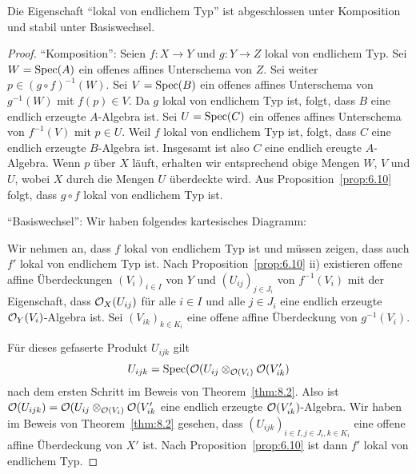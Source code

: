 \begin{prop}
\label{prop:8.11}
	Die Eigenschaft \enquote{lokal von endlichem Typ} ist abgeschlossen unter Komposition und stabil unter Basiswechsel.
	\begin{proof}
		\enquote{Komposition}: Seien $f\colon X \to Y$ und $g \colon Y \to Z$ lokal von endlichem Typ. Sei $W = \operatorname{Spec}(A)$ ein offenes affines Unterschema von $Z$. Sei weiter $p \in (g \circ f)^{-1}(W)$. Sei $V=\operatorname{Spec}(B)$ ein offenes affines Unterschema von $g^{-1}(W)$ mit $f(p) \in V$. Da $g$ lokal von endlichem Typ ist, folgt, dass $B$ eine endlich erzeugte $A$-Algebra ist. Sei $U = \operatorname{Spec}(C)$ ein offenes affines Unterschema von $f^{-1}(V)$ mit $p \in U$. Weil $f$ lokal von endlichem Typ ist, folgt, dass $C$ eine endlich erzeugte $B$-Algebra ist. Insgesamt ist also $C$ eine endlich ereugte $A$-Algebra. Wenn $p$ über $X$ läuft, erhalten wir entsprechend obige Mengen $W$, $V$ und $U$, wobei $X$ durch die Mengen $U$ überdeckte wird. Aus Proposition~\ref{prop:6.10} folgt, dass $g\circ f$ lokal von endlichem Typ ist.

		\enquote{Basiswechsel}: Wir haben folgendes kartesisches Diagramm:
		\begin{center}
		\end{center}
		Wir nehmen an, dass $f$ lokal von endlichem Typ ist und müssen zeigen, dass auch $f'$ lokal von endlichem Typ ist. Nach Proposition~\ref{prop:6.10} ii) existieren offene affine Überdeckungen $(V_i)_{i\in I}$ von $Y$ und $(U_{ij})_{j\in J_i}$ von $f^{-1}(V_i)$ mit der Eigenschaft, dass $\mathcal{O}_X(U_{ij})$ für alle $i\in I$ und alle $j \in J_i$ eine endlich erzeugte $\mathcal{O}_Y(V_i)$-Algebra ist. Sei $(V_{ik})_{k \in K_i}$ eine offene affine Überdeckung von $g^{-1}(V_i)$.
		\begin{center}
		\end{center}
		Für dieses gefaserte Produkt $U_{ijk}$ gilt
		\[
			U_{ijk} = \operatorname{Spec}(\mathcal{O}(U_{ij} \otimes_{\mathcal{O}(V_i)} \mathcal{O}(V_{ik}')
		\]
		nach dem ersten Schritt im Beweis von Theorem~\ref{thm:8.2}. Also ist $\mathcal{O}(U_{ijk}) = \mathcal{O}(U_{ij} \otimes_{\mathcal{O}(V_i)} \mathcal{O}(V_{ik}'$ eine endlich erzeugte $\mathcal{O}(V_{ik}')$-Algebra. Wir haben im Beweis von Theorem~\ref{thm:8.2} gesehen, dass $(U_{ijk})_{i\in I,j\in J_i, k \in K_i}$ eine offene affine Überdeckung von $X'$ ist. Nach Proposition~\ref{prop:6.10} ist dann $f'$ lokal von endlichem Typ.
	\end{proof}
\end{prop}
